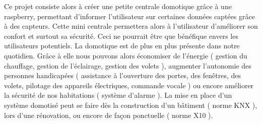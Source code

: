 Ce projet consiste alors à créer une petite centrale domotique grâce à une raspberry, permettant d'informer l'utilisateur sur certaines données captées grâce à des capteurs. Cette mini centrale permettera alors à l'utilisateur d'améliorer son confort et surtout sa sécurité. Ceci ne pourrait être que bénéfique envers les utilisateurs potentiels. La domotique est de plus en plus présente dans notre quotidien. Grâce à elle nous pouvons alors économiser de l'énergie ( gestion du chauffage, gestion de l'éclairage, gestion des volets ), augmenter l'autonomie des personnes handicapées ( assistance à l'ouverture des portes, des fenêtres, des volets, pilotage des appareils électriques, commande vocale ) ou encore améliorer la sécurité de nos habitations ( système d'alarme ). La mise en place d'un système domotisé peut se faire dès la construction d'un bâtiment ( norme KNX ), lors d'une rénovation, ou encore de façon ponctuelle ( norme X10 ).





